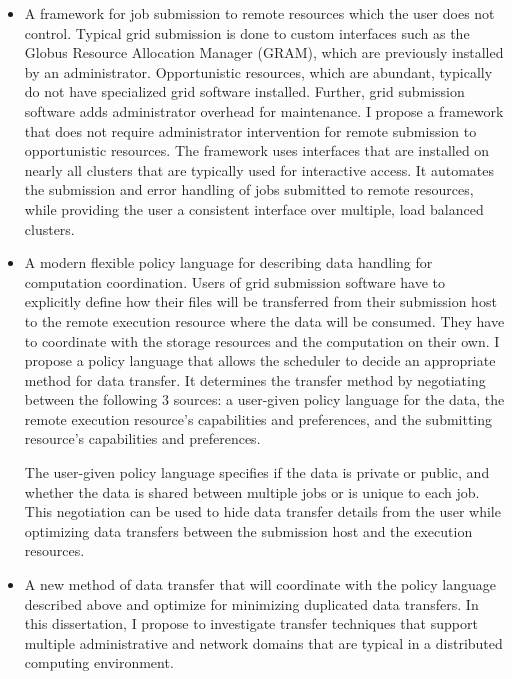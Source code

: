 \begin{itemize}

\item A framework for job submission to remote resources which the user does not control.  Typical grid submission is done to custom interfaces such as the Globus Resource Allocation Manager \cite{foster1999globus} (GRAM), which are previously installed by an administrator.  Opportunistic resources, which are abundant, typically do not have specialized grid software installed.  Further, grid submission software adds administrator overhead for maintenance.  I propose a framework that does not require administrator intervention for remote submission to opportunistic resources.  The framework uses interfaces that are installed on nearly all clusters that are typically used for interactive access.  It automates the submission and error handling of jobs submitted to remote resources, while providing the user a consistent interface over multiple, load balanced clusters.

\item A modern flexible policy language for describing data handling for computation coordination.  Users of grid submission software have to explicitly define how their files will be transferred from their submission host to the remote execution resource where the data will be consumed.  They have to coordinate with the storage resources and the computation on their own.  I propose a policy language that allows the scheduler to decide an appropriate method for data transfer.  It determines the transfer method by negotiating between the following 3 sources: a user-given policy language for the data, the remote execution resource's capabilities and preferences, and the submitting resource's capabilities and preferences.  

The user-given policy language specifies if the data is private or public, and whether the data is shared between multiple jobs or is unique to each job.  This negotiation can be used to hide data transfer details from the user while optimizing data transfers between the submission host and the execution resources.

\item A new method of data transfer that will coordinate with the policy language described above and optimize for minimizing duplicated data transfers.  In this dissertation, I propose to investigate transfer techniques that support multiple administrative and network domains that are typical in a distributed computing environment.

\end{itemize}

